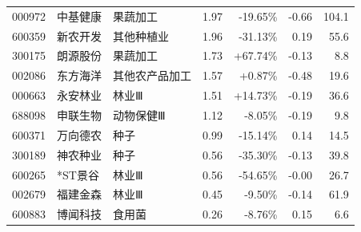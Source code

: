 \begin{longtable}{@{}llp{2.4cm}rrrr@{}}
000972 & 中基健康 & 果蔬加工 & 1.97 & -19.65\% & -0.66 & 104.1 \\
600359 & 新农开发 & 其他种植业 & 1.96 & -31.13\% & 0.19 & 55.6 \\
300175 & 朗源股份 & 果蔬加工 & 1.73 & +67.74\% & -0.13 & 8.8 \\
002086 & 东方海洋 & 其他农产品加工 & 1.57 & +0.87\% & -0.48 & 19.6 \\
000663 & 永安林业 & 林业Ⅲ & 1.51 & +14.73\% & -0.19 & 36.6 \\
688098 & 申联生物 & 动物保健Ⅲ & 1.12 & -8.05\% & -0.19 & 9.8 \\
600371 & 万向德农 & 种子 & 0.99 & -15.14\% & 0.14 & 14.5 \\
300189 & 神农种业 & 种子 & 0.56 & -35.30\% & -0.13 & 39.8 \\
600265 & *ST景谷 & 林业Ⅲ & 0.56 & -54.65\% & -0.00 & 26.7 \\
002679 & 福建金森 & 林业Ⅲ & 0.45 & -9.50\% & -0.14 & 61.9 \\
600883 & 博闻科技 & 食用菌 & 0.26 & -8.76\% & 0.15 & 6.6 \\
\end{longtable}
\endgroup
